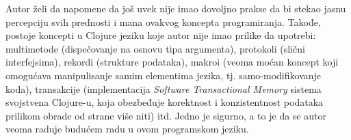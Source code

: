Autor želi da napomene da još uvek nije imao dovoljno prakse da bi stekao jasnu percepciju svih prednosti i mana ovakvog koncepta programiranja. Takođe, postoje koncepti u Clojure jeziku koje autor nije imao prilike da upotrebi: multimetode (dispečovanje na osnovu tipa argumenta), protokoli (slični interfejsima), rekordi (strukture podataka), makroi (veoma moćan koncept koji omogućava manipulisanje samim elementima jezika, tj. samo-modifikovanje koda), transakcije (implementacija \textit{Software Transactional Memory} sistema svojstvena Clojure-u, koja obezbeđuje korektnost i konzistentnost podataka prilikom obrade od strane više niti) itd. Jedno je sigurno, a to je da se autor veoma raduje budućem radu u ovom programskom jeziku.